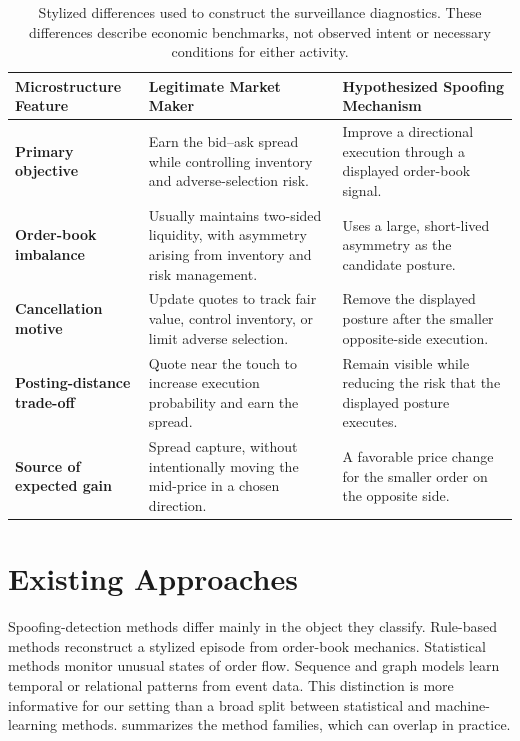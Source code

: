 \documentclass[11pt]{article}
\begin{document}
\begin{table}[htbp]
\centering
\caption{Stylized differences used to construct the surveillance diagnostics. These differences describe economic
benchmarks, not observed intent or necessary conditions for either activity.}
\label{tab:surveillance-models}
\renewcommand{\arraystretch}{1.4}
\setlength{\tabcolsep}{8pt}

\begin{tabularx}{\textwidth}{
    >{\raggedright\arraybackslash\bfseries}p{}
    >{\raggedright\arraybackslash}X
    >{\raggedright\arraybackslash}X
}
\toprule
\rowcolor{gray!15}
\textbf{Microstructure Feature} & \textbf{Legitimate Market Maker} & \textbf{Hypothesized Spoofing Mechanism} \\
\midrule
Primary objective
& Earn the bid--ask spread while controlling inventory and adverse-selection risk.
& Improve a directional execution through a displayed order-book signal. \\

Order-book imbalance
& Usually maintains two-sided liquidity, with asymmetry arising from inventory and risk management.
& Uses a large, short-lived asymmetry as the candidate posture. \\

Cancellation motive
& Update quotes to track fair value, control inventory, or limit adverse selection.
& Remove the displayed posture after the smaller opposite-side execution. \\

Posting-distance trade-off
& Quote near the touch to increase execution probability and earn the spread.
& Remain visible while reducing the risk that the displayed posture executes. \\

Source of expected gain
& Spread capture, without intentionally moving the mid-price in a chosen direction.
& A favorable price change for the smaller order on the opposite side. \\
\bottomrule
\end{tabularx}
\end{table}

\section{Existing Approaches}
\label{sec:existing_approaches}
Spoofing-detection methods differ mainly in the object they classify. Rule-based methods reconstruct a stylized episode
from order-book mechanics. Statistical methods monitor unusual states of order flow. Sequence and graph models learn
temporal or relational patterns from event data. This distinction is more informative for our setting than a broad split
between statistical and machine-learning methods.  summarizes the method families, which can
overlap in practice.
\end{document}
